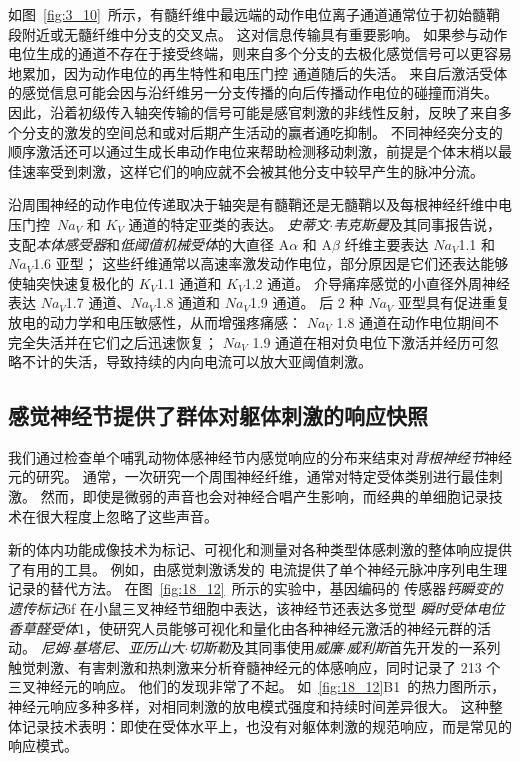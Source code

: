 如图~\ref{fig:3_10}~所示，有髓纤维中最远端的动作电位离子通道通常位于初始髓鞘段附近或无髓纤维中分支的交叉点。
这对信息传输具有重要影响。
如果参与动作电位生成的通道不存在于接受终端，则来自多个分支的去极化感觉信号可以更容易地累加，因为动作电位的再生特性和电压门控  通道随后的失活。
来自后激活受体的感觉信息可能会因与沿纤维另一分支传播的向后传播动作电位的碰撞而消失。
因此，沿着初级传入轴突传输的信号可能是感官刺激的非线性反射，反映了来自多个分支的激发的空间总和或对后期产生活动的赢者通吃抑制。
不同神经突分支的顺序激活还可以通过生成长串动作电位来帮助检测移动刺激，前提是个体末梢以最佳速率受到刺激，这样它们的响应就不会被其他分支中较早产生的脉冲分流。



沿周围神经的动作电位传递取决于轴突是有髓鞘还是无髓鞘以及每根神经纤维中电压门控~$Na_V$ 和 $K_V$ 通道的特定亚类的表达。
\textit{史蒂文$\cdot$韦克斯曼}及其同事报告说，支配\textit{本体感受器}和\textit{低阈值机械受体}的大直径 A$\alpha$ 和 A$\beta$ 纤维主要表达 $Na_V$1.1 和 $Na_V$1.6 亚型；
这些纤维通常以高速率激发动作电位，部分原因是它们还表达能够使轴突快速复极化的 $K_V$1.1 通道和 $K_V$1.2 通道。
介导痛痒感觉的小直径外周神经表达 $Na_V$1.7 通道、$Na_V$1.8 通道和 $Na_V$1.9 通道。
后 2 种 $Na_V$ 亚型具有促进重复放电的动力学和电压敏感性，从而增强疼痛感：
$Na_V$ 1.8 通道在动作电位期间不完全失活并在它们之后迅速恢复； 
$Na_V$ 1.9 通道在相对负电位下激活并经历可忽略不计的失活，导致持续的内向电流可以放大亚阈值刺激。



\subsection{感觉神经节提供了群体对躯体刺激的响应快照}

我们通过检查单个哺乳动物体感神经节内感觉响应的分布来结束对\textit{背根神经节}神经元的研究。
通常，一次研究一个周围神经纤维，通常对特定受体类别进行最佳刺激。
然而，即使是微弱的声音也会对神经合唱产生影响，而经典的单细胞记录技术在很大程度上忽略了这些声音。


新的体内功能成像技术为标记、可视化和测量对各种类型体感刺激的整体响应提供了有用的工具。
例如，由感觉刺激诱发的  电流提供了单个神经元脉冲序列电生理记录的替代方法。
在图~\ref{fig:18_12}~所示的实验中，基因编码的  传感器\textit{钙瞬变的遗传标记}6f 在小鼠三叉神经节细胞中表达，该神经节还表达多觉型 \textit{瞬时受体电位香草醛受体}1，使研究人员能够可视化和量化由各种神经元激活的神经元群的活动。
\textit{尼姆$\cdot$基塔尼}、\textit{亚历山大$\cdot$切斯勒}及其同事使用\textit{威廉$\cdot$威利斯}首先开发的一系列触觉刺激、有害刺激和热刺激来分析脊髓神经元的体感响应，同时记录了 213 个三叉神经元的响应\cite{2017Specialized}。
他们的发现非常了不起。
如~\ref{fig:18_12}B1~的热力图所示，神经元响应多种多样，对相同刺激的放电模式强度和持续时间差异很大。
这种整体记录技术表明：即使在受体水平上，也没有对躯体刺激的规范响应，而是常见的响应模式。

